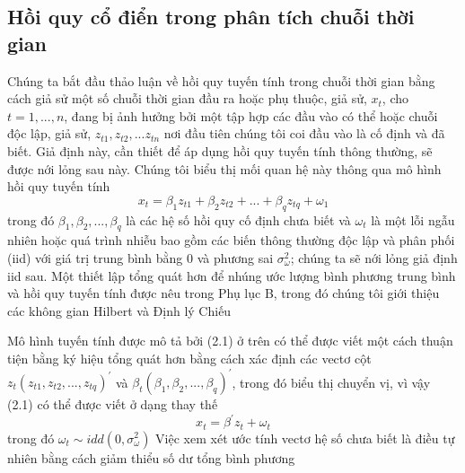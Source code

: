\documentclass[12pt, a4paper,oneside]{book}
\theoremstyle{definition}
\begin{document}
\subsection{Hồi quy cổ điển trong phân tích chuỗi thời gian}
Chúng ta bắt đầu thảo luận về hồi quy tuyến tính trong chuỗi thời gian bằng cách giả sử một số chuỗi thời gian đầu ra hoặc phụ thuộc, giả sử, $x_{t}$, cho $t = 1 ,. . . , n$, đang bị ảnh hưởng bởi một tập hợp các đầu vào có thể hoặc chuỗi độc lập, giả sử, $z_{t1}, z_{t2},...z_{tn}$ nơi đầu tiên chúng tôi coi đầu vào là cố định và đã biết. Giả định này, cần thiết để áp dụng hồi quy tuyến tính thông thường, sẽ được nới lỏng sau này. Chúng tôi biểu thị mối quan hệ này thông qua mô hình hồi quy tuyến tính 
$$x_{t}=\beta_{1}z_{t1} + \beta_{2}z_{t2} +...+ \beta_{q}z_{tq} +\omega_{1}$$
trong đó $\beta_{1},\beta_{2},...,\beta_{q}$ là các hệ số hồi quy cố định chưa biết và $ {\omega_{t}} $ là một lỗi ngẫu nhiên hoặc quá trình nhiễu bao gồm các biến thông thường độc lập và phân phối (iid) với giá trị trung bình bằng 0 và phương sai $ \sigma_{\omega}^{2} $; chúng ta sẽ nới lỏng giả định iid sau. Một thiết lập tổng quát hơn để nhúng ước lượng bình phương trung bình và hồi quy tuyến tính được nêu trong Phụ lục B, trong đó chúng tôi giới thiệu các không gian Hilbert và Định lý Chiếu

Mô hình tuyến tính được mô tả bởi (2.1) ở trên có thể được viết một cách thuận tiện bằng ký hiệu tổng quát hơn bằng cách xác định các vectơ cột $z_{t}(z_{t1},z_{t2},...,z_{tq})^{'}$ và $\beta_{t}(\beta_{1},\beta_{2},...,\beta_{q})^{'}$, trong đó biểu thị chuyển vị, vì vậy (2.1) có thể được viết ở dạng thay thế	
$$x_{t}=\beta^{'} z_{t} + \omega_{t} $$
trong đó $\omega_{t} \sim idd(0,\sigma_{\omega}^{2})$ Việc xem xét ước tính vectơ hệ số chưa biết là điều tự nhiên bằng cách giảm thiểu số dư tổng bình phương
\end{document}
